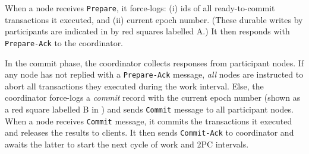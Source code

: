 When a node receives \texttt{Prepare}, it force-logs:
(i)  ids of all ready-to-commit transactions it executed,
and (ii) current epoch number. (These durable writes by participants are indicated in  by red squares labelled A.)
It then responds with
\texttt{Prepare-Ack} to the coordinator.

In the commit phase, the coordinator collects responses from participant nodes.
If any node has not replied with a \texttt{Prepare-Ack} message,
\emph{all} nodes are instructed to abort all transactions they executed during the work interval.
Else, the coordinator force-logs a \emph{commit} record with the current epoch number (shown as a red square labelled B in ) and sends \texttt{Commit} message to all participant nodes.
When a node receives \texttt{Commit} message, it commits the transactions it executed and releases the results to clients. It then sends \texttt{Commit-Ack} to coordinator and awaits the latter to start the next cycle of work and 2PC intervals.


